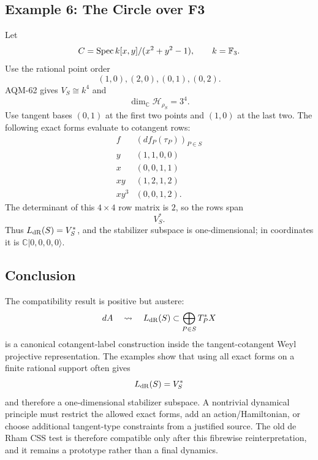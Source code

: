 \subsection{Example 6: The Circle over F3}

Let
\[
  C=\operatorname{Spec} k[x,y]/(x^2+y^2-1),\qquad k=\mathbb F_3.
\]
Use the rational point order
\[
  (1,0),(2,0),(0,1),(0,2).
\]
AQM-62 gives \(V_S\cong k^4\) and
\[
  \dim_{\mathbb C}\mathcal H_{\rho_S}=3^4.
\]
Use tangent bases \((0,1)\) at the first two points and \((1,0)\) at the last
two.  The following exact forms evaluate to cotangent rows:
\[
\begin{array}{c|c}
f & (df_P(\tau_P))_{P\in S}\\ \hline
y & (1,1,0,0)\\
x & (0,0,1,1)\\
xy & (1,2,1,2)\\
xy^3 & (0,0,1,2).
\end{array}
\]
The determinant of this \(4\times4\) row matrix is \(2\), so the rows span
\[
  V_S^*.
\]
Thus \(L_{\rm dR}(S)=V_S^*\), and the stabilizer subspace is one-dimensional;
in coordinates it is \(\mathbb C|0,0,0,0\rangle\).

\subsection{Conclusion}

The compatibility result is positive but austere:
\[
  dA\quad\leadsto\quad L_{\rm dR}(S)\subset
  \bigoplus_{P\in S}T_P^*X
\]
is a canonical cotangent-label construction inside the tangent-cotangent Weyl
projective representation.  The examples show that using all exact forms on a
finite rational support often gives
\[
  L_{\rm dR}(S)=V_S^*
\]
and therefore a one-dimensional stabilizer subspace.  A nontrivial dynamical
principle must restrict the allowed exact forms, add an action/Hamiltonian, or
choose additional tangent-type constraints from a justified source.  The old de
Rham CSS test is therefore compatible only after this fibrewise
reinterpretation, and it remains a prototype rather than a final dynamics.

